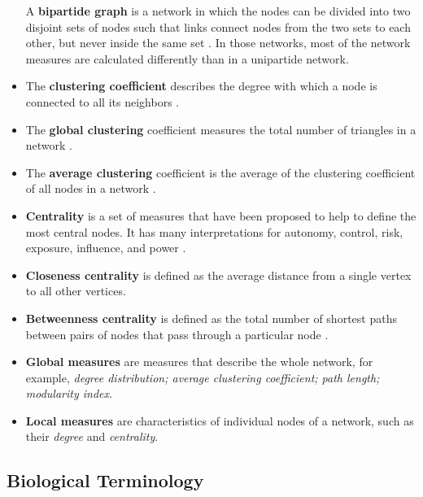 \documentclass[
]{book}
\begin{document}
\begin{itemize}
  A \textbf{bipartide graph} is a network in which the nodes can be divided into two disjoint sets of nodes such that links connect nodes from the two sets to each other, but never inside the same set \citep{Barabasi2016}. In those networks, most of the network measures are calculated differently than in a unipartide network.
\item
  The \textbf{clustering coefficient} describes the degree with which a node is connected to all its neighbors \citep{barabasi2004network}.
\item
  The \textbf{global clustering} coefficient measures the total number of triangles in a network \citep{Barabasi2016}.
\item
  The \textbf{average clustering} coefficient is the average of the clustering coefficient of all nodes in a network \citep{barabasi2004network}.
\item
  \textbf{Centrality} is a set of measures that have been proposed to help to define the most central nodes. It has many interpretations for autonomy, control, risk, exposure, influence, and power \citep{Borgatti2006ACentrality}.
\item
  \textbf{Closeness centrality} is defined as the average distance from a single vertex to all other vertices\citep{Newman2018}.
\item
  \textbf{Betweenness centrality} is defined as the total number of shortest paths between pairs of nodes that pass through a particular node \citep{Newman2018}.
\item
  \textbf{Global measures} are measures that describe the whole network, for example, \emph{degree distribution; average clustering coefficient; path length; modularity index}.
\item
  \textbf{Local measures} are characteristics of individual nodes of a network, such as their \emph{degree} and \emph{centrality}.
\end{itemize}

\hypertarget{biological-terminology}{%
\subsection{Biological Terminology}\label{biological-terminology}}
\end{document}
